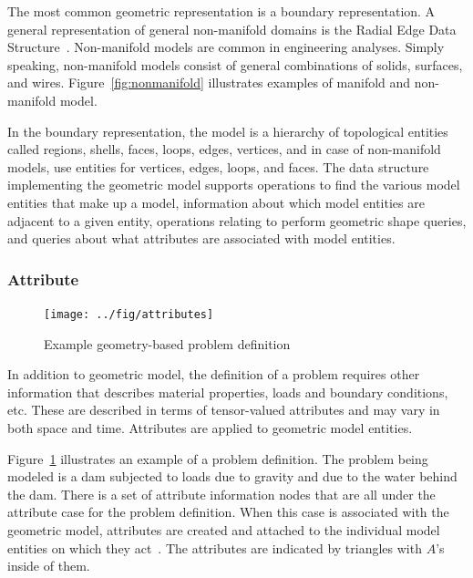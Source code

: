 The most common geometric representation is a boundary representation. A general
representation of general non-manifold domains is the Radial Edge Data
Structure~\cite{weiler88}. Non-manifold models are common in engineering analyses. Simply speaking,
non-manifold models consist of general combinations of solids, surfaces, and
wires. Figure~\ref{fig:nonmanifold} illustrates examples of manifold and
non-manifold model.

In the boundary representation, the model is a hierarchy of topological entities
called regions, shells, faces, 
loops, edges, vertices, and in case of non-manifold models, use entities for vertices, edges, loops, and
faces.  %
The data structure implementing the geometric model supports operations
to find the various model entities that make up a model, information about which model
entities are adjacent to a given entity, operations relating to perform
geometric shape queries, and queries about what attributes are associated with model
entities.

\subsubsection{Attribute}

\begin{figure}
\centering
\texttt{[image: ../fig/attributes]}
\caption[Example geometry-based problem definition]{Example geometry-based problem definition~\cite{beallthesis}}
\label{fig:dam}  %
\end{figure}

In addition to geometric model, the definition of a problem requires other information that describes material
properties, loads and boundary conditions, etc. These
are described in terms of tensor-valued 
attributes and may vary in both space and time. Attributes are applied to geometric model entities. 

Figure~\ref{fig:dam} illustrates an example of a problem definition. The problem being modeled is a
dam subjected to loads due to gravity and due to the water behind the dam. There
is a set of attribute information nodes that are all under the attribute case
for the problem definition. When this case is associated with the geometric model,
attributes are created and attached to the individual model entities on which they act~\cite{beallthesis,
simmetrixweb}. The attributes are indicated by triangles with $A$'s inside of them.

